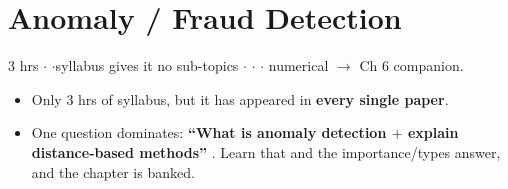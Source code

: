 \section{Anomaly / Fraud Detection}

{\color{sub}\footnotesize 3 hrs \gap$\cdot$\gap {} \gap$\cdot$\gap syllabus gives it no sub-topics \gap$\cdot$\gap {} \gap$\cdot$\gap {} \gap$\cdot$ numerical
$\rightarrow$ Ch 6 companion.}

\begin{itemize}
  \item Only 3 hrs of syllabus, but it has appeared in \textbf{every single paper}.
  \item One question dominates: \textbf{``What is anomaly detection $+$ explain distance-based
        methods''} . Learn that and the importance/types answer, and the chapter is banked.
\end{itemize}

\hr


{\color{sub}\footnotesize {} }

